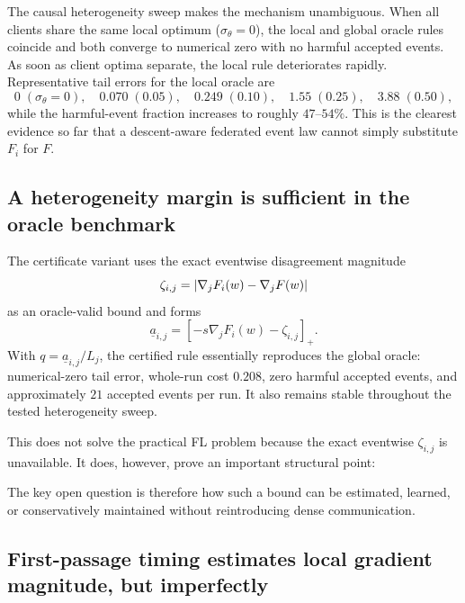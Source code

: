 The causal heterogeneity sweep makes the mechanism unambiguous. When all clients share the same local optimum ($\sigma_\theta=0$), the local and global oracle rules coincide and both converge to numerical zero with no harmful accepted events. As soon as client optima separate, the local rule deteriorates rapidly. Representative tail errors for the local oracle are
\begin{equation}
  0\;(\sigma_\theta=0),\quad
  0.070\;(0.05),\quad
  0.249\;(0.10),\quad
  1.55\;(0.25),\quad
  3.88\;(0.50),
\end{equation}
while the harmful-event fraction increases to roughly $47$--$54\%$. This is the clearest evidence so far that a descent-aware federated event law cannot simply substitute $F_i$ for $F$.

\subsection{A heterogeneity margin is sufficient in the oracle benchmark}

The certificate variant uses the exact eventwise disagreement magnitude
\begin{equation}
  \zeta_{i,j}=\left|\nabla_jF_i(w)-\nabla_jF(w)\right|
\end{equation}
as an oracle-valid bound and forms
\begin{equation}
  \underline a_{i,j}=[-s\nabla_jF_i(w)-\zeta_{i,j}]_+.
\end{equation}
With $q=\underline a_{i,j}/L_j$, the certified rule essentially reproduces the global oracle: numerical-zero tail error, whole-run cost $0.208$, zero harmful accepted events, and approximately $21$ accepted events per run. It also remains stable throughout the tested heterogeneity sweep.

This does not solve the practical FL problem because the exact eventwise $\zeta_{i,j}$ is unavailable. It does, however, prove an important structural point:
\begin{center}
\end{center}
The key open question is therefore how such a bound can be estimated, learned, or conservatively maintained without reintroducing dense communication.

\subsection{First-passage timing estimates local gradient magnitude, but imperfectly}

